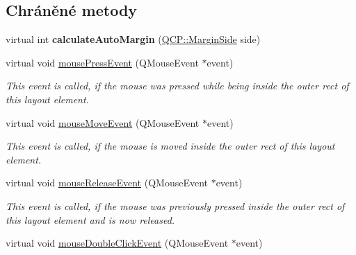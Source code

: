 \subsection*{Chráněné metody}
\begin{DoxyCompactItemize}
\item 
\hypertarget{classQCPLayoutElement_a005c9f0fe84bc1591a2cf2c46fd477b4}{}virtual int {\bfseries calculate\+Auto\+Margin} (\hyperlink{namespaceQCP_a7e487e3e2ccb62ab7771065bab7cae54}{Q\+C\+P\+::\+Margin\+Side} side)\label{classQCPLayoutElement_a005c9f0fe84bc1591a2cf2c46fd477b4}

\item 
\hypertarget{classQCPLayoutElement_a2d82ea21fe0ee628f177bd824bc51a71}{}virtual void \hyperlink{classQCPLayoutElement_a2d82ea21fe0ee628f177bd824bc51a71}{mouse\+Press\+Event} (Q\+Mouse\+Event $\ast$event)\label{classQCPLayoutElement_a2d82ea21fe0ee628f177bd824bc51a71}

\begin{DoxyCompactList}\small\item\em This event is called, if the mouse was pressed while being inside the outer rect of this layout element. \end{DoxyCompactList}\item 
\hypertarget{classQCPLayoutElement_a14f4acf58cdb8dd2c6c571479c4c4a40}{}virtual void \hyperlink{classQCPLayoutElement_a14f4acf58cdb8dd2c6c571479c4c4a40}{mouse\+Move\+Event} (Q\+Mouse\+Event $\ast$event)\label{classQCPLayoutElement_a14f4acf58cdb8dd2c6c571479c4c4a40}

\begin{DoxyCompactList}\small\item\em This event is called, if the mouse is moved inside the outer rect of this layout element. \end{DoxyCompactList}\item 
\hypertarget{classQCPLayoutElement_ae526ac828cce1e5bb94eaa85776d7404}{}virtual void \hyperlink{classQCPLayoutElement_ae526ac828cce1e5bb94eaa85776d7404}{mouse\+Release\+Event} (Q\+Mouse\+Event $\ast$event)\label{classQCPLayoutElement_ae526ac828cce1e5bb94eaa85776d7404}

\begin{DoxyCompactList}\small\item\em This event is called, if the mouse was previously pressed inside the outer rect of this layout element and is now released. \end{DoxyCompactList}\item 
\hypertarget{classQCPLayoutElement_aa8fef6486cb6ceb7c82cbdd50bc32ee9}{}virtual void \hyperlink{classQCPLayoutElement_aa8fef6486cb6ceb7c82cbdd50bc32ee9}{mouse\+Double\+Click\+Event} (Q\+Mouse\+Event $\ast$event)\label{classQCPLayoutElement_aa8fef6486cb6ceb7c82cbdd50bc32ee9}


\end{DoxyCompactItemize}
